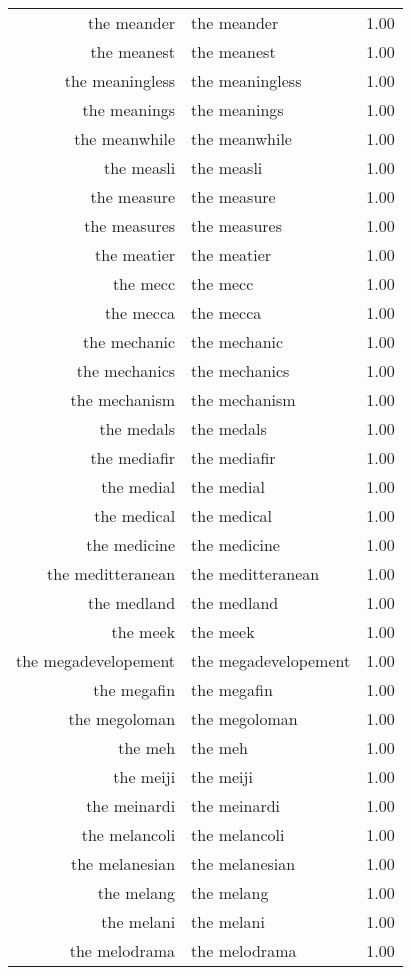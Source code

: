 \begin{table}[ht]
\begin{tabular}{rlr}
  the meander & the meander & 1.00 \\ 
  the meanest & the meanest & 1.00 \\ 
  the meaningless & the meaningless & 1.00 \\ 
  the meanings & the meanings & 1.00 \\ 
  the meanwhile & the meanwhile & 1.00 \\ 
  the measli & the measli & 1.00 \\ 
  the measure & the measure & 1.00 \\ 
  the measures & the measures & 1.00 \\ 
  the meatier & the meatier & 1.00 \\ 
  the mecc & the mecc & 1.00 \\ 
  the mecca & the mecca & 1.00 \\ 
  the mechanic & the mechanic & 1.00 \\ 
  the mechanics & the mechanics & 1.00 \\ 
  the mechanism & the mechanism & 1.00 \\ 
  the medals & the medals & 1.00 \\ 
  the mediafir & the mediafir & 1.00 \\ 
  the medial & the medial & 1.00 \\ 
  the medical & the medical & 1.00 \\ 
  the medicine & the medicine & 1.00 \\ 
  the meditteranean & the meditteranean & 1.00 \\ 
  the medland & the medland & 1.00 \\ 
  the meek & the meek & 1.00 \\ 
  the megadevelopement & the megadevelopement & 1.00 \\ 
  the megafin & the megafin & 1.00 \\ 
  the megoloman & the megoloman & 1.00 \\ 
  the meh & the meh & 1.00 \\ 
  the meiji & the meiji & 1.00 \\ 
  the meinardi & the meinardi & 1.00 \\ 
  the melancoli & the melancoli & 1.00 \\ 
  the melanesian & the melanesian & 1.00 \\ 
  the melang & the melang & 1.00 \\ 
  the melani & the melani & 1.00 \\ 
  the melodrama & the melodrama & 1.00 \\ 

\end{tabular}
\end{table}
